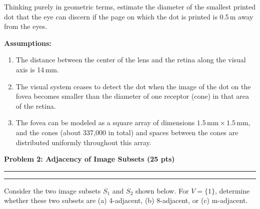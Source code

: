 \documentclass[12pt]{article}
\newcommand{\question}[1]{%
  \clearpage
  \vspace{0.5cm}
  {\noindent\normalsize \textbf{#1}}
  \vspace{0.2cm}
  \hrule
  \vspace{0.1cm}
  \hrule
  \vspace{0.3cm}
}
\begin{document}
Thinking purely in geometric terms, estimate the diameter of the smallest printed dot that the eye can discern if the page on which the dot is printed is 0.5\,m away from the eyes.

\textbf{Assumptions:}
\begin{enumerate}
    \item The distance between the center of the lens and the retina along the visual axis is 14\,mm.
    \item The visual system ceases to detect the dot when the image of the dot on the fovea becomes smaller than the diameter of one receptor (cone) in that area of the retina.
    \item The fovea can be modeled as a square array of dimensions $1.5\,\text{mm} \times 1.5\,\text{mm}$, and the cones (about 337{,}000 in total) and spaces between the cones are distributed uniformly throughout this array.
\end{enumerate}



\question{Problem 2: Adjacency of Image Subsets (25 pts)}\label{quest:2}

Consider the two image subsets $S_1$ and $S_2$ shown below. For $V = \{1\}$, determine whether these two subsets are (a) 4-adjacent, (b) 8-adjacent, or (c) m-adjacent.
\end{document}
